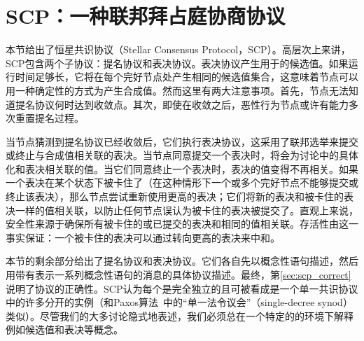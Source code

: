 \section{SCP：一种联邦拜占庭协商协议}\label{sec:scp}

本节给出了恒星共识协议（Stellar Consensus Protocol，SCP）。高层次上来讲，SCP包含两个子协议：提名协议和表决协议。表决协议产生用于{\slot}的候选值。如果运行时间足够长，它将在每个完好节点处产生相同的候选值集合，这意味着节点可以用一种确定性的方式为{\slot}产生合成值。然而这里有两大注意事项。首先，节点无法知道提名协议何时达到收敛点。其次，即使在收敛之后，恶性行为节点或许有能力多次重置提名过程。

当节点猜测到提名协议已经收敛后，它们执行表决协议，这采用了联邦选举来提交或终止与合成值相关联的表决。当节点同意提交一个表决时，将会为讨论中的{\slot}具体化和表决相关联的值。当它们同意终止一个表决时，表决的值变得不再相关。如果一个表决在某个状态下被卡住了（在这种情形下一个或多个完好节点不能够提交或终止该表决），那么节点尝试重新使用更高的表决；它们将新的表决和被卡住的表决一样的值相关联，以防止任何节点误认为被卡住的表决被提交了。直观上来说，安全性来源于确保所有被卡住的或已提交的表决和相同的值相关联。存活性由这一事实保证：一个被卡住的表决可以通过转向更高的表决来中和。

本节的剩余部分给出了提名协议和表决协议。它们各自先以概念性语句描述，然后用带有表示一系列概念性语句的消息的具体协议描述。最终，第\ref{sec:scp_correct}说明了协议的正确性。SCP认为每个{\slot}是完全独立的且可被看成是一个单一{\slot}共识协议中的许多分开的实例（和Paxos算法~\cite{Lamport:1998:PP:279227.279229}中的``单一法令议会''（single-decree synod）类似）。尽管我们的大多讨论隐式地表述{\slot}，我们必须总在一个特定的{\slot}的环境下解释例如候选值和表决等概念。



